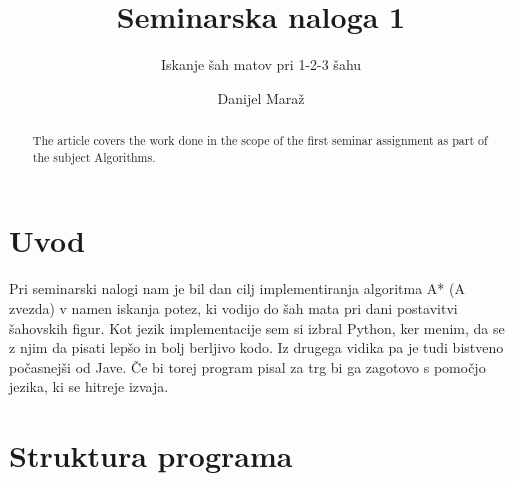 \documentclass[runningheads]{llncs}
\begin{document}
\title{Seminarska naloga 1}
\subtitle{Iskanje šah matov pri 1-2-3 šahu}

\author{Danijel Maraž}



\maketitle             

\begin{abstract}
The article covers the work done in the scope of the first seminar assignment as part of the subject Algorithms. 

\end{abstract}

\section{Uvod}
Pri seminarski nalogi nam je bil dan cilj implementiranja algoritma A* (A zvezda) v namen iskanja
potez, ki vodijo do šah mata pri dani postavitvi šahovskih figur. Kot jezik implementacije sem si izbral Python, ker menim, da se z njim da pisati lepšo in bolj berljivo kodo. Iz drugega vidika pa je tudi bistveno počasnejši od Jave. Če bi torej program pisal za trg bi ga zagotovo s pomočjo jezika, ki se hitreje izvaja. 

\section{Struktura programa}
\end{document}
